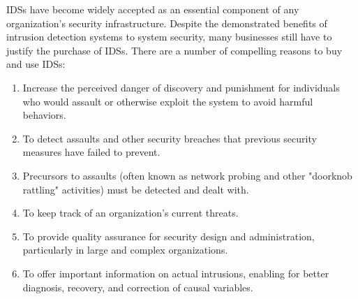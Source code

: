 \documentclass[12pt]{article}
\begin{document}
    \par IDSs have become widely accepted as an essential component of any organization's security infrastructure. Despite the demonstrated benefits of intrusion detection systems to system security, many businesses still have to justify the purchase of IDSs. There are a number of compelling reasons to buy and use IDSs:
    \\
    
    \begin{enumerate}
    \item Increase the perceived danger of discovery and punishment for individuals who would assault or otherwise exploit the system to avoid harmful behaviors.
    \item To detect assaults and other security breaches that previous security measures have failed to prevent.
    \item Precursors to assaults (often known as network probing and other "doorknob rattling" activities) must be detected and dealt with.
    \item To keep track of an organization's current threats.
    \item To provide quality assurance for security design and administration, particularly in large and complex organizations.
    \item To offer important information on actual intrusions, enabling for better diagnosis, recovery, and correction of causal variables.
    \end{enumerate}
    \\
    
\end{document}
